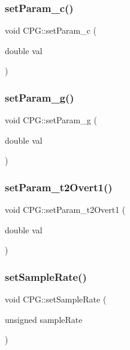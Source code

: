\subsubsection{\texorpdfstring{set\+Param\+\_\+c()}{setParam\_c()}}
{\footnotesize\ttfamily void C\+P\+G\+::set\+Param\+\_\+c (\begin{DoxyParamCaption}\item[{double}]{val }\end{DoxyParamCaption})}

\mbox{\label{classCPG_ae62c8cdcb43ab515477ca5fcac94f5e1}} 
\subsubsection{\texorpdfstring{set\+Param\+\_\+g()}{setParam\_g()}}
{\footnotesize\ttfamily void C\+P\+G\+::set\+Param\+\_\+g (\begin{DoxyParamCaption}\item[{double}]{val }\end{DoxyParamCaption})}

\mbox{\label{classCPG_a67c0d2d6de22109fe467f4e05c0a37b9}} 
\subsubsection{\texorpdfstring{set\+Param\+\_\+t2\+Overt1()}{setParam\_t2Overt1()}}
{\footnotesize\ttfamily void C\+P\+G\+::set\+Param\+\_\+t2\+Overt1 (\begin{DoxyParamCaption}\item[{double}]{val }\end{DoxyParamCaption})}

\mbox{\label{classCPG_af2a9107312b1344e19d2aca96a2da4c2}} 
\subsubsection{\texorpdfstring{set\+Sample\+Rate()}{setSampleRate()}}
{\footnotesize\ttfamily void C\+P\+G\+::set\+Sample\+Rate (\begin{DoxyParamCaption}\item[{unsigned}]{sample\+Rate }\end{DoxyParamCaption})}

